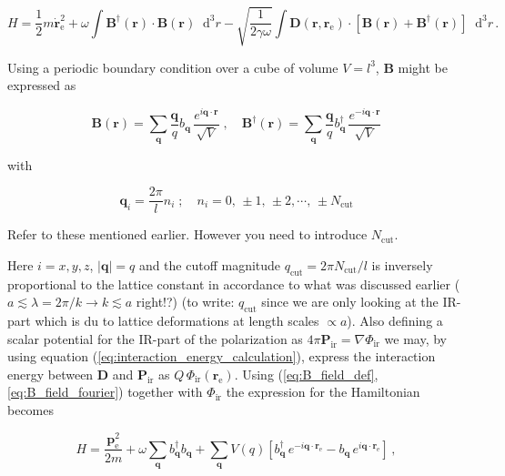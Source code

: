 \documentclass[12pt]{report}
\renewcommand{\vec}[1]{\boldsymbol{\mathbf{#1}}}                        %
\newcommand*\diff{\mathop{}\!\mathrm{d}}
\newcommand{\motivation}[1]{{\leavevmode\color{motivation}#1}}
\newcommand{\todo}[1]{{\leavevmode\color{todo}#1}}
\begin{document}
\begin{equation}
	H = \frac{1}{2} m \dot{\vec r}_\text{e}^2
	+ \omega \int \vec B^\dagger (\vec r) \cdot \vec B (\vec r) \diff^3 r
	- \sqrt{\frac{1}{2 \gamma \omega}} \int \vec D(\vec r, \vec r_\text{e}) \cdot \left[ \vec B(\vec r) +  \vec B^\dagger(\vec r) \right] \diff^3 r \,.
\end{equation}

Using a periodic boundary condition over a cube of volume $ V = l^3 $, $ \vec B $ might be expressed as

\begin{equation}
	\label{eq:B_field_fourier}
	\vec B (\vec r) = \sum_{\vec q} \frac{\vec q}{q} b_{\vec q} \, \frac{e^{i \vec q \cdot \vec r}}{\sqrt V}
	\; , \quad
	\vec B^\dagger (\vec r) = \sum_{\vec q} \frac{\vec q}{q} b^\dagger_{\vec q} \, \frac{e^{-i \vec q \cdot \vec r}}{\sqrt V}
\end{equation}

with

\begin{equation}
	\vec q_i = \frac{2\pi}{l} n_i
	\; ; \quad 
	n_i = 0, \, \pm 1, \, \pm 2, \cdots , \, \pm N_\text{cut}
\end{equation}

\todo{Refer to these mentioned earlier. However you need to introduce $ N_\text{cut} $.}

Here  $ i = x, y, z $, $ | \vec q | = q $ and the cutoff magnitude $ q_\text{cut} = 2 \pi N_\text{cut} / l $ is inversely proportional to the lattice constant in accordance to what was discussed earlier \motivation{($ a \lesssim \lambda = 2 \pi / k \rightarrow k \lesssim a $ right!?)} \todo{(to write: $ q_\text{cut} $ since we are only looking at the IR-part which is du to lattice deformations at length scales $ \propto  a $)}. Also defining a scalar potential for the IR-part of the polarization as $ 4 \pi \vec P_\text{ir} = \nabla \Phi_\text{ir} $ we may, by using equation (\ref{eq:interaction_energy_calculation}), express the interaction energy between $ \vec D $ and $ \vec P_\text{ir} $ as $ Q \, \Phi_\text{ir} (\vec r_\text{e}) $. Using (\ref{eq:B_field_def}, \ref{eq:B_field_fourier}) together with $ \Phi_\text{ir} $ the expression for the Hamiltonian becomes

\begin{equation}
	H = \frac{\vec p_\text{e}^2}{2m}
	+ \omega \sum_{\vec q} b^\dagger_{\vec q} b_{\vec q}
	+ \sum_{\vec q} V(q) \left[ b^\dagger_{\vec q} \, e^{-i \vec q \cdot \vec r_\text{e}} - b_{\vec q} \, e^{i \vec q \cdot \vec r_\text{e}} \right] \,,
\end{equation}
\end{document}
